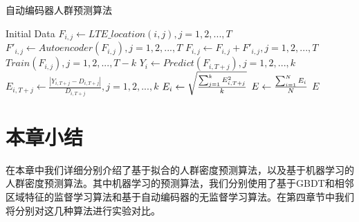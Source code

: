 \begin{algorithm}
    \caption{自动编码器人群预测算法}
    \label{algo:auto-algo}
    \begin{algorithmic}[1]
    \State Initial Data
        \State $F_{i,j} \gets LTE\_location(i,j), j=1,2,...,T$
        \State ${F'}_{i,j} \gets Autoencoder(F_{i,j}), j=1,2,...,T$
        \State $F_{i,j} \gets F_{i,j} + {F'}_{i,j}, j=1,2,...,T$
        \State $Train(F_{i,j}), j=1,2,...,T-k$
        \State $Y_i \gets Predict(F_{i,T+j}), j=1,2,...,k$
        \State $E_{i,T+j} \gets \frac{|Y_{i,T+j}-D_{i,T+j}|}{D_{i,T+j}}, j=1,2,...,k$
        \State $E_i \gets {\sqrt  {\sum _{{j=1}}^{k}E_{i,T+j}^{2} \over k}}$
    \EndFor
    \State $E \gets {\sum _{{i=1}}^{N}E_{i} \over N}$
    \State 
    \Return $E$
    \end{algorithmic}
\end{algorithm}

\section{本章小结}

在本章中我们详细分别介绍了基于拟合的人群密度预测算法，以及基于机器学习的人群密度预测算法。其中机器学习的预测算法，我们分别使用了基于GBDT和相邻区域特征的监督学习算法和基于自动编码器的无监督学习算法。在第四章节中我们将分别对这几种算法进行实验对比。 
